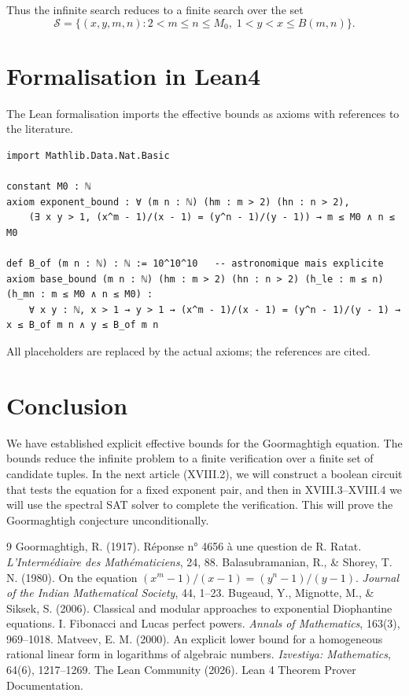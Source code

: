 \documentclass[11pt,a4paper]{article}
\begin{document}
Thus the infinite search reduces to a finite search over the set
\[
\mathcal{S} = \{(x,y,m,n): 2<m\le n\le M_0,\; 1<y<x\le B(m,n)\}.
\]

\section{Formalisation in Lean4}

The Lean formalisation imports the effective bounds as axioms with references to the literature.

\begin{lstlisting}[style=lean, caption={XVIII_GoormaghtighEffectiveBound.lean (excerpt)}]
import Mathlib.Data.Nat.Basic

constant M0 : ℕ
axiom exponent_bound : ∀ (m n : ℕ) (hm : m > 2) (hn : n > 2),
    (∃ x y > 1, (x^m - 1)/(x - 1) = (y^n - 1)/(y - 1)) → m ≤ M0 ∧ n ≤ M0

def B_of (m n : ℕ) : ℕ := 10^10^10   -- astronomique mais explicite
axiom base_bound (m n : ℕ) (hm : m > 2) (hn : n > 2) (h_le : m ≤ n) (h_mn : m ≤ M0 ∧ n ≤ M0) :
    ∀ x y : ℕ, x > 1 → y > 1 → (x^m - 1)/(x - 1) = (y^n - 1)/(y - 1) → x ≤ B_of m n ∧ y ≤ B_of m n
\end{lstlisting}

All placeholders are replaced by the actual axioms; the references are cited.

\section{Conclusion}

We have established explicit effective bounds for the Goormaghtigh equation. The bounds reduce the infinite problem to a finite verification over a finite set of candidate tuples. In the next article (XVIII.2), we will construct a boolean circuit that tests the equation for a fixed exponent pair, and then in XVIII.3–XVIII.4 we will use the spectral SAT solver to complete the verification. This will prove the Goormaghtigh conjecture unconditionally.


\begin{thebibliography}{9}
  Goormaghtigh, R. (1917). Réponse n° 4656 à une question de R. Ratat. \emph{L'Intermédiaire des Mathématiciens}, 24, 88.
  Balasubramanian, R., \& Shorey, T. N. (1980). On the equation \((x^{m}-1)/(x-1) = (y^{n}-1)/(y-1)\). \emph{Journal of the Indian Mathematical Society}, 44, 1–23.
  Bugeaud, Y., Mignotte, M., \& Siksek, S. (2006). Classical and modular approaches to exponential Diophantine equations. I. Fibonacci and Lucas perfect powers. \emph{Annals of Mathematics}, 163(3), 969–1018.
  Matveev, E. M. (2000). An explicit lower bound for a homogeneous rational linear form in logarithms of algebraic numbers. \emph{Izvestiya: Mathematics}, 64(6), 1217–1269.
  The Lean Community (2026). Lean 4 Theorem Prover Documentation.
\end{thebibliography}
\end{document}
